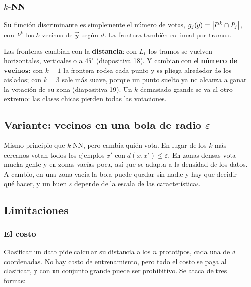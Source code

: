 \documentclass[11pt,letterpaper]{article}
\begin{document}
\subsubsection*{$k$-NN}

Su función discriminante es simplemente el número de votos,
$g_j(\vec{y}) = \left\lvert P^k \cap P_j \right\rvert$, con $P^k$ los $k$ vecinos de
$\vec{y}$ según $d$. La frontera también es lineal por tramos.

Las fronteras cambian con la \textbf{distancia}: con $L_1$ los tramos
se vuelven horizontales, verticales o a $45^\circ$
(diapositiva 18). Y cambian con el \textbf{número de vecinos}: con
$k = 1$ la frontera rodea cada punto y se pliega alrededor de los
aislados; con $k = 3$ sale más suave, porque un punto suelto ya no
alcanza a ganar la votación de su zona (diapositiva 19). Un $k$
demasiado grande se va al otro extremo: las clases chicas pierden
todas las votaciones.


\subsection*{Variante: vecinos en una bola de radio $\varepsilon$}

Mismo principio que $k$-NN, pero cambia quién vota. En lugar de los
$k$ más cercanos votan todos los ejemplos $x'$ con
$d(x, x') \leq \varepsilon$. En zonas densas vota mucha gente y en
zonas vacías poca, así que se adapta a la densidad de los datos. A
cambio, en una zona vacía la bola puede quedar sin nadie y hay que
decidir qué hacer, y un buen $\varepsilon$ depende de la escala de
las características.


\subsection*{Limitaciones}

\subsubsection*{El costo}

Clasificar un dato pide calcular su distancia a los $n$ prototipos,
cada una de $d$ coordenadas. No hay costo de entrenamiento, pero todo
el costo se paga al clasificar, y con un conjunto grande puede ser
prohibitivo. Se ataca de tres formas:
\end{document}
